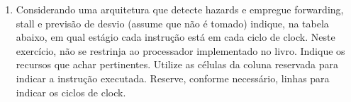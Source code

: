 \documentclass{article}
\begin{document}
\begin{enumerate}
\begin{table}[H]
\begin{tabular}{|l|l|l|l|l|l|l|l|l|l|l|l|l|l|l|l|l|l|}
  &     &     &     &     &     &     &     &     &     &     &     &     &     &     &     &     &     \\ \hline
 &     &     &     &     &     &     &     &     &     &     &     &     &     &     &     &     &     \\ \hline
 &     &     &     &     &     &     &     &     &     &     &     &     &     &     &     &     &     \\ \hline
 &     &     &     &     &     &     &     &     &     &     &     &     &     &     &     &     &     \\ \hline
 &     &     &     &     &     &     &     &     &     &     &     &     &     &     &     &     &     \\ \hline
 &     &     &     &     &     &     &     &     &     &     &     &     &     &     &     &     &     \\ \hline
 &     &     &     &     &     &     &     &     &     &     &     &     &     &     &     &     &     \\ \hline
 &     &     &     &     &     &     &     &     &     &     &     &     &     &     &     &     &     \\ \hline
 &     &     &     &     &     &     &     &     &     &     &     &     &     &     &     &     &     \\ \hline
 &     &     &     &     &     &     &     &     &     &     &     &     &     &     &     &     &     \\ \hline
 &     &     &     &     &     &     &     &     &     &     &     &     &     &     &     &     &     \\ \hline
 &     &     &     &     &     &     &     &     &     &     &     &     &     &     &     &     &     \\ \hline
 &     &     &     &     &     &     &     &     &     &     &     &     &     &     &     &     &     \\ \hline
 &     &     &     &     &     &     &     &     &     &     &     &     &     &     &     &     &     \\ \hline
\end{tabular}
\end{table}

\pagebreak

\item Considerando uma arquitetura que detecte hazards e empregue forwarding, stall e previsão de desvio (assume que não é tomado) indique, na tabela abaixo, em qual estágio cada instrução está em cada ciclo de clock. Neste exercício, não se restrinja ao processador implementado no livro. Indique os recursos que achar pertinentes. Utilize as células da coluna reservada para indicar a instrução executada. Reserve, conforme necessário, linhas para indicar os ciclos de clock.


\end{enumerate}
\end{document}
